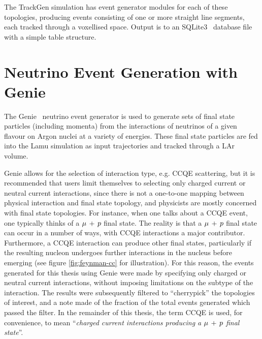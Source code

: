 The TrackGen simulation has event generator modules for each of these topologies, producing events consisting of one or more straight line segments, each tracked through a voxellised space. Output is to an SQLite3~\citep{SQLite} database file with a simple table structure.

\section{Neutrino Event Generation with Genie}\label{sec:genie}
The Genie~\citep{Genie} neutrino event generator is used to generate sets of final state particles (including momenta) from the interactions of neutrinos of a given flavour on Argon nuclei at a variety of energies. These final state particles are fed into the Lamu simulation as input trajectories and tracked through a \ac{LAr} volume.

Genie allows for the selection of interaction type, e.g. \ac{CCQE} scattering, but it is recommended that users limit themselves to selecting only charged current or neutral current interactions, since there is not a one-to-one mapping between physical interaction and final state topology, and physicists are mostly concerned with final state topologies. For instance, when one talks about a \ac{CCQE} event, one typically thinks of a $\mu\,+\,p$ final state. The reality is that a $\mu\,+\,p$ final state can occur in a number of ways, with \ac{CCQE} interactions a major contributor. Furthermore, a \ac{CCQE} interaction can produce other final states, particularly if the resulting nucleon undergoes further interactions in the nucleus before emerging (see figure \ref{fig:feynman-cc} for illustration). For this reason, the events generated for this thesis using Genie were made by specifying only charged or neutral current interactions, without imposing limitations on the subtype of the interaction. The results were subsequently filtered to ``cherrypick'' the topologies of interest, and a note made of the fraction of the total events generated which passed the filter. In the remainder of this thesis, the term CCQE is used, for convenience, to mean ``\emph{charged current interactions producing a $\mu\,+\,p$ final state}''.

